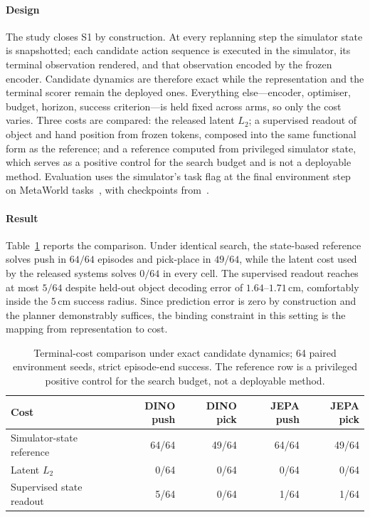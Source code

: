\documentclass[11pt,letterpaper]{article}
\begin{document}
\paragraph{Design}
The study closes S1 by construction. At every replanning step the simulator state
is snapshotted; each candidate action sequence is executed in the simulator, its
terminal observation rendered, and that observation encoded by the frozen
encoder. Candidate dynamics are therefore exact while the representation and the
terminal scorer remain the deployed ones. Everything else---encoder, optimiser,
budget, horizon, success criterion---is held fixed across arms, so only the cost
varies. Three costs are compared: the released latent $L_2$; a supervised readout
of object and hand position from frozen tokens, composed into the same functional
form as the reference; and a reference computed from privileged simulator state,
which serves as a positive control for the search budget and is not a deployable
method. Evaluation uses the simulator's task flag at the final environment step
on MetaWorld tasks~\citep{yu2020metaworld}, with checkpoints
from~\citet{jepawms2025}.

\paragraph{Result}
Table~\ref{tab:terminal} reports the comparison. Under identical search, the
state-based reference solves push in $64/64$ episodes and pick-place in $49/64$,
while the latent cost used by the released systems solves $0/64$ in every cell.
The supervised readout reaches at most $5/64$ despite held-out object decoding
error of $1.64$--$1.71$\,cm, comfortably inside the $5$\,cm success radius. Since
prediction error is zero by construction and the planner demonstrably suffices,
the binding constraint in this setting is the mapping from representation to
cost.

\begin{table}[t]
\centering\small
\caption{Terminal-cost comparison under exact candidate dynamics; 64 paired
environment seeds, strict episode-end success. The reference row is a privileged
positive control for the search budget, not a deployable
method.}\label{tab:terminal}
\begin{tabular}{@{}lrrrr@{}}
\toprule
Cost & DINO push & DINO pick & JEPA push & JEPA pick \\
\midrule
Simulator-state reference & 64/64 & 49/64 & 64/64 & 49/64 \\
Latent $L_2$ & 0/64 & 0/64 & 0/64 & 0/64 \\
Supervised state readout & 5/64 & 0/64 & 1/64 & 1/64 \\
\bottomrule
\end{tabular}
\end{table}
\end{document}
